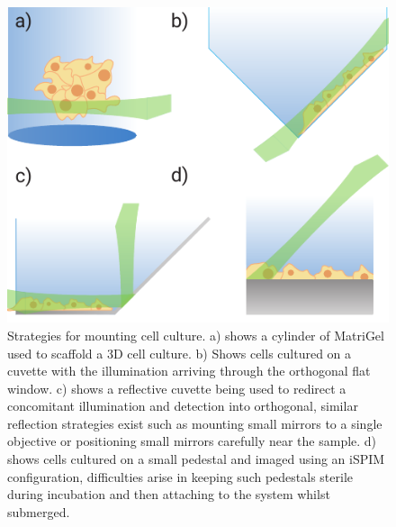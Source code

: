 \begin{figure}
    \centering
    \includegraphics{./mounting_straegies_cells}
    \caption{Strategies for mounting cell culture.
    a) shows a cylinder of MatriGel used to scaffold a 3D cell culture.
    b) Shows cells cultured on a cuvette with the illumination arriving through the orthogonal flat window.
    c) shows a reflective cuvette being used to redirect a concomitant illumination and detection into orthogonal, similar reflection strategies exist such as mounting small mirrors to a single objective or positioning small mirrors carefully near the sample.
    d) shows cells cultured on a small pedestal and imaged using an iSPIM configuration, difficulties arise in keeping such pedestals sterile during incubation and then attaching to the system whilst submerged.
    }
    \label{fig:mounting_straegies_cells}
\end{figure}

